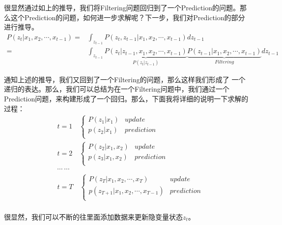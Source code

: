 \documentclass[a4paper]{article}
\begin{document}
很显然通过如上的推导，我们将Filtering问题回归到了一个Prediction的问题。那么这个Prediction的问题，如何进一步求解呢？下一步，我们对Prediction的部分进行推导。
\begin{equation}
    \begin{split}
        P(z_t|x_1,x_2,\cdots,x_{t-1}) 
        = & \int_{z_{t-1}} P(z_t,z_{t-1}|x_1,x_2,\cdots,x_{t-1}) dz_{t-1} \\
        = &  \int_{z_{t-1}} \underbrace{P(z_t|z_{t-1},x_1,x_2,\cdots,x_{t-1})}_{P(z_t|z_{t-1})} \underbrace{P(z_{t-1}|x_1,x_2,\cdots,x_{t-1})}_{Filtering} dz_{t-1} 
    \end{split}
\end{equation}

通知上述的推导，我们又回到了一个Filtering的问题，那么这样我们形成了 一个递归的表达。那么，我们可以总结为在一个Filtering问题中，我们通过一个Prediction问题，来构建形成了一个回归。那么，下面我将详细的说明一下求解的过程：
\begin{equation}
    \begin{split}
        & t=1 \quad 
        \left\{
            \begin{array}{ll}
            P(z_1|x_1) & update \\
            p(z_2|x_1) & prediction \\
            \end{array}
        \right. \\
        & t=2 \quad 
        \left\{
            \begin{array}{ll}
            P(z_2|x_1,x_2) & update \\
            p(z_3|x_1,x_2) & prediction \\
            \end{array}
        \right. \\
        & \cdots\ \cdots \\
        & t=T \quad 
        \left\{
            \begin{array}{ll}
            P(z_T|x_1,x_2,\cdots,x_T) & update \\
            p(z_{T+1}|x_1,x_2,\cdots,x_{T-1}) & prediction \\
            \end{array}
        \right. \\
    \end{split}
\end{equation}

很显然，我们可以不断的往里面添加数据来更新隐变量状态$z_{t}$。
\end{document}
